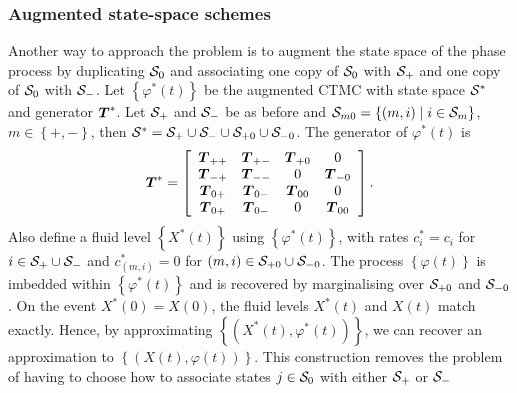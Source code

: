 \subsubsection{Augmented state-space schemes}\label{subsec: augmented }
Another way to approach the problem is to augment the state space of the phase process by duplicating \(\mathcal{S}_0\) and associating one copy of \(\mathcal{S}_0\) with \(\mathcal{S}_+\) and one copy of \(\mathcal{S}_0\) with \(\mathcal{S}_-\). Let \(\left\{\varphi^*(t)\right\}\) be the augmented CTMC with state space \(\mathcal{S}^*\) and generator \(\boldsymbol{T}^*\). Let \(\mathcal{S}_+\) and \(\mathcal{S}_-\) be as before and \(\mathcal{S}_{m0} = \left\{(m,i)\mid i\in\mathcal{S}_m\right\}\), \(m\in\left\{+,-\right\}\), then \(\mathcal{S}^* = \mathcal{S}_+\cup\mathcal{S}_-\cup\mathcal{S}_{+0}\cup\mathcal{S}_{-0}\). 
The generator of \(\varphi^*(t)\) is
\[\boldsymbol{T}^* = \left[\begin{array}{cccc} \boldsymbol{T}_{++} & \boldsymbol{T}_{+-} & \boldsymbol{T}_{+0} & 0 \\ \boldsymbol{T}_{-+} & \boldsymbol{T}_{--} & 0 & \boldsymbol{T}_{-0} \\ \boldsymbol{T}_{0+} & \boldsymbol{T}_{0-} & \boldsymbol{T}_{00} & 0 \\  \boldsymbol{T}_{0+} & \boldsymbol{T}_{0-} & 0 & \boldsymbol{T}_{00} \end{array}\right]. \]
Also define a fluid level \(\left\{X^*(t)\right\}\) using \(\left\{\varphi^*(t)\right\}\), with rates \(c_i^*=c_i\) for \(i\in\mathcal{S}_+\cup\mathcal{S}_-\) and \(c_{(m,i)}^* = 0\) for \((m,i)\in\mathcal{S}_{+0}\cup\mathcal{S}_{-0}\). The process \(\left\{\varphi(t)\right\}\) is imbedded within \(\left\{\varphi^*(t)\right\}\) and is recovered by marginalising over \(\mathcal{S}_{+0}\) and \(\mathcal{S}_{-0}\). On the event \(X^*(0)=X(0)\), the fluid levels \(X^*(t)\) and \(X(t)\) match exactly. Hence, by approximating \(\left\{(X^*(t),\varphi^*(t))\right\}\), we can recover an approximation to \(\left\{(X(t),\varphi(t))\right\}\). This construction removes the problem of having to choose how to associate states \(j\in\mathcal{S}_0\) with either \(\mathcal{S}_+\) or \(\mathcal{S}_-\)

